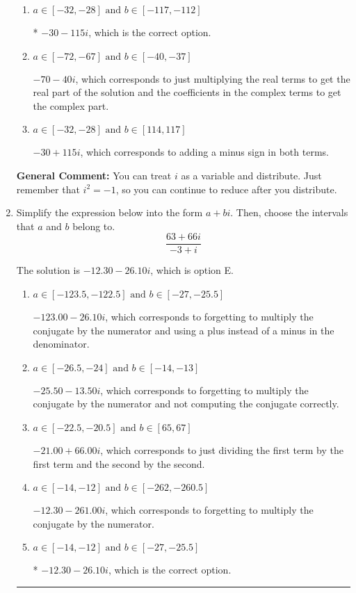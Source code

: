 \documentclass{extbook}[14pt]
\newcommand{\litem}[1]{\item #1

\rule{\textwidth}{0.4pt}}
\begin{document}
\begin{enumerate}
{\begin{enumerate}[label=\Alph*.]
 $-110 - 45 i$, which corresponds to adding a minus sign in the second term.
\item \( a \in [-32, -28] \text{ and } b \in [-117, -112] \)

* $-30 - 115 i$, which is the correct option.
\item \( a \in [-72, -67] \text{ and } b \in [-40, -37] \)

 $-70 - 40 i$, which corresponds to just multiplying the real terms to get the real part of the solution and the coefficients in the complex terms to get the complex part.
\item \( a \in [-32, -28] \text{ and } b \in [114, 117] \)

 $-30 + 115 i$, which corresponds to adding a minus sign in both terms.
\end{enumerate}

\textbf{General Comment:} You can treat $i$ as a variable and distribute. Just remember that $i^2=-1$, so you can continue to reduce after you distribute.
}
\litem{
Simplify the expression below into the form $a+bi$. Then, choose the intervals that $a$ and $b$ belong to.
\[ \frac{63 + 66 i}{-3 + i} \]

The solution is \( -12.30  - 26.10 i \), which is option E.\begin{enumerate}[label=\Alph*.]
\item \( a \in [-123.5, -122.5] \text{ and } b \in [-27, -25.5] \)

 $-123.00  - 26.10 i$, which corresponds to forgetting to multiply the conjugate by the numerator and using a plus instead of a minus in the denominator.
\item \( a \in [-26.5, -24] \text{ and } b \in [-14, -13] \)

 $-25.50  - 13.50 i$, which corresponds to forgetting to multiply the conjugate by the numerator and not computing the conjugate correctly.
\item \( a \in [-22.5, -20.5] \text{ and } b \in [65, 67] \)

 $-21.00  + 66.00 i$, which corresponds to just dividing the first term by the first term and the second by the second.
\item \( a \in [-14, -12] \text{ and } b \in [-262, -260.5] \)

 $-12.30  - 261.00 i$, which corresponds to forgetting to multiply the conjugate by the numerator.
\item \( a \in [-14, -12] \text{ and } b \in [-27, -25.5] \)

* $-12.30  - 26.10 i$, which is the correct option.
\end{enumerate}

}
\end{enumerate}
\end{document}
